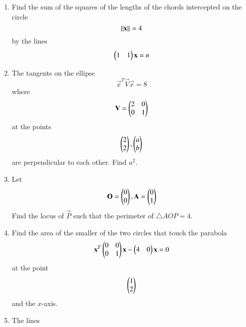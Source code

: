 \documentclass[journal,12pt,twocolumn]{IEEEtran}
\begin{document}
\begin{enumerate}[label=\arabic*.]
\begin{enumerate}
\end{enumerate}
\item Find the sum of the squares of the lengths of the chords intercepted on the circle 
\begin{equation}
\left\Vert\mathbf{x}\right\Vert= 4
\end{equation}
by the lines
\begin{equation}
\begin{pmatrix}1 & 1 \end{pmatrix}\mathbf{x}  =n
\end{equation}
\item The tangents on the ellipse
\begin{equation}
\vec{x}^T\vec{V}\vec{x} =8
\end{equation}
%
where
\begin{equation}
\mathbf{V} = \begin{pmatrix}2 & 0 \\ 0 & 1\end{pmatrix}
\end{equation}
at the points 
\begin{equation}
 \begin{pmatrix}2 \\ 2\end{pmatrix}, \begin{pmatrix}a \\ b\end{pmatrix}
\end{equation}
%
are perpendicular to each other. Find $a^2$.
\item Let 
\begin{equation}
\mathbf{O} = \begin{pmatrix} 0 \\ 0 \end{pmatrix},
\mathbf{A} = \begin{pmatrix} 0 \\ 1 \end{pmatrix}
\end{equation}
Find the locus of $\vec{P}$ such that the perimeter of $\triangle AOP = 4$.
\item Find the area of the smaller of the two circles that touch the parabola 
\begin{equation}
\mathbf{x}^T\begin{pmatrix}0 & 0 \\ 0 & 1\end{pmatrix}\mathbf{x} - \begin{pmatrix}4 & 0\end{pmatrix}\mathbf{x}  =0
\end{equation}
at the point 
\begin{equation}
\begin{pmatrix} 1 \\ 2 \end{pmatrix}
\end{equation}
and the $x$-axis.
\item The lines 

\end{enumerate}
\end{document}
